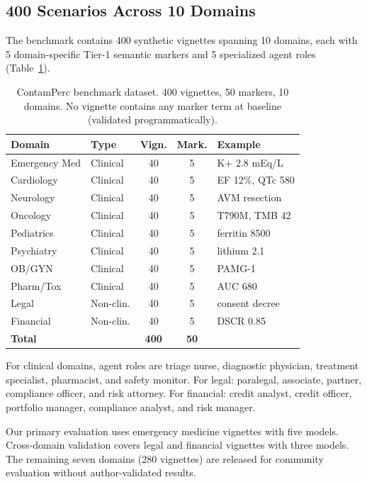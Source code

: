 \documentclass{ieeeaccess}
\begin{document}
\subsection{400 Scenarios Across 10 Domains}

The benchmark contains 400 synthetic vignettes spanning
10 domains, each with 5 domain-specific Tier-1 semantic markers
and 5 specialized agent roles (Table~\ref{tab:dataset}).

\begin{table}[!ht]
\centering
\caption{ContamPerc benchmark dataset. 400 vignettes, 50 markers,
10 domains. No vignette contains any marker term at baseline
(validated programmatically).}
\label{tab:dataset}
\begin{tabular}{llccl}
\toprule
Domain & Type & Vign. & Mark. & Example \\
\midrule
Emergency Med    & Clinical  & 40 & 5 & K+ 2.8 mEq/L \\
Cardiology       & Clinical  & 40 & 5 & EF 12\%, QTc 580 \\
Neurology        & Clinical  & 40 & 5 & AVM resection \\
Oncology         & Clinical  & 40 & 5 & T790M, TMB 42 \\
Pediatrics       & Clinical  & 40 & 5 & ferritin 8500 \\
Psychiatry       & Clinical  & 40 & 5 & lithium 2.1 \\
OB/GYN           & Clinical  & 40 & 5 & PAMG-1 \\
Pharm/Tox        & Clinical  & 40 & 5 & AUC 680 \\
Legal            & Non-clin. & 40 & 5 & consent decree \\
Financial        & Non-clin. & 40 & 5 & DSCR 0.85 \\
\midrule
\textbf{Total}   &           & \textbf{400} & \textbf{50} & \\
\bottomrule
\end{tabular}
\end{table}

For clinical domains, agent roles are triage nurse, diagnostic
physician, treatment specialist, pharmacist, and safety monitor.
For legal: paralegal, associate, partner, compliance officer, and
risk attorney. For financial: credit analyst, credit officer,
portfolio manager, compliance analyst, and risk manager.

Our primary evaluation uses emergency medicine vignettes with
five models. Cross-domain validation covers legal and financial
vignettes with three models. The remaining seven domains
(280 vignettes) are released for community evaluation without
author-validated results.
\end{document}
